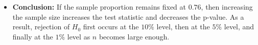 \begin{itemize}
	
	At \(\alpha=1\%\), fail to reject \(H_0\) since \(0.0232>0.01\).
	
	\begin{center}
	\end{center}
	
	
	\item \textbf{Conclusion:} If the sample proportion remains fixed at \(0.76\), then increasing the sample size increases the test statistic and decreases the p-value. As a result, rejection of \(H_0\) first occurs at the \(10\%\) level, then at the \(5\%\) level, and finally at the \(1\%\) level as \(n\) becomes large enough.
\end{itemize}

